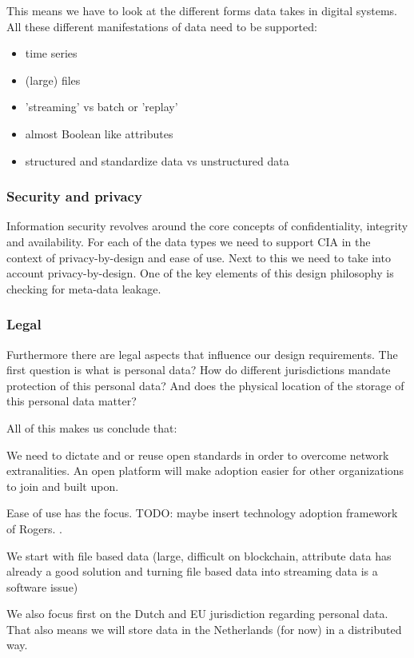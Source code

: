 \documentclass{article}
\begin{document}
This means we have to look at the different forms data takes in digital systems. All these different manifestations of data need to be supported:
\begin{itemize}
    \item time series
    \item (large) files
    \item 'streaming' vs batch or 'replay'
    \item almost Boolean like attributes
    \item structured and standardize data vs unstructured data
\end{itemize}

\subsubsection{Security and privacy}
Information security revolves around the core concepts of confidentiality, integrity and availability. For each of the data types we need to support CIA in the context of privacy-by-design and ease of use. Next to this we need to take into account privacy-by-design. One of the key elements of this design philosophy is checking for meta-data leakage.

\subsubsection{Legal}
Furthermore there are legal aspects that influence our design requirements. The first question is what is personal data? How do different jurisdictions mandate protection of this personal data? And does the physical location of the storage of this personal data matter?

All of this makes us conclude that:

We need to dictate and or reuse open standards in order to overcome network extranalities. An open platform will make adoption easier for other organizations to join and built upon.

Ease of use has the focus. TODO: maybe insert technology adoption framework of Rogers. \cite{rogers2010diffusion}.

We start with file based data (large, difficult on blockchain, attribute data has already a good solution and turning file based data into streaming data is a software issue)

We also focus first on the Dutch and EU jurisdiction regarding personal data. That also means we will store data in the Netherlands (for now) in a distributed way. 
\end{document}
